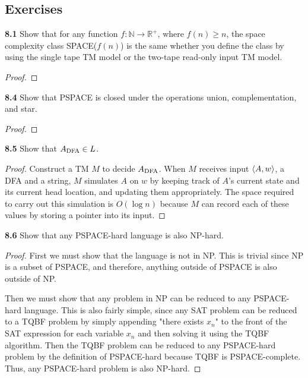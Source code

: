 \subsection{Exercises}

\textbf{8.1} Show that for any function $f:\mathbb{N} \rightarrow \mathbb{R}^+$, where $f(n) \geq n$, the space complexity class SPACE($f(n)$) is the same whether you define the class by using the single tape TM model or the two-tape read-only input TM model.

\begin{mdframed}
\begin{proof}

\end{proof}
\end{mdframed}

\label{exe:PSPACE_CLOSURE}
\textbf{8.4} Show that PSPACE is closed under the operations union, complementation, and star.

\begin{mdframed}
\begin{proof}

\end{proof}
\end{mdframed}

\label{lang:ADFA_L}
\textbf{8.5} Show that $A_{\text{DFA}} \in L$.
\begin{mdframed}
\begin{proof}
Construct a TM $M$ to decide $A_{\text{DFA}}$. When $M$ receives input $\langle{A, w}\rangle$, a DFA and a string, $M$ simulates $A$ on $w$ by keeping track of $A$’s current state and its current head location, and updating them appropriately. The space required to carry out this simulation is $O(\log n)$ because $M$ can record each of these values by storing a pointer into its input.
\end{proof}
\end{mdframed}

\textbf{8.6} Show that any PSPACE-hard language is also NP-hard.

\begin{mdframed}
\begin{proof}
First we must show that the language is not in NP. This is trivial since NP is a subset of PSPACE, and therefore, anything outside of PSPACE is also outside of NP.

Then we must show that any problem in NP can be reduced to any PSPACE-hard language. This is also fairly simple, since any SAT problem can be reduced to a TQBF problem by simply appending "there exists $x_n$" to the front of the SAT expression for each variable $x_n$ and then solving it using the TQBF algorithm. Then the TQBF problem can be reduced to any PSPACE-hard problem by the definition of PSPACE-hard because TQBF is PSPACE-complete. Thus, any PSPACE-hard problem is also NP-hard.
\end{proof}
\end{mdframed}


